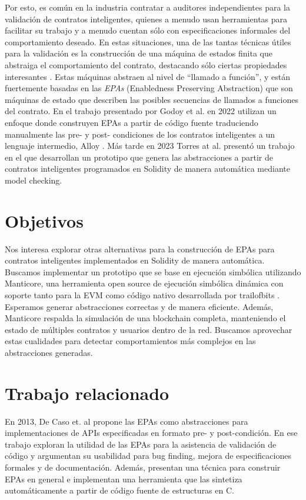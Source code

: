 Por esto, es común en la industria contratar a auditores independientes para la validación de contratos inteligentes,
quienes a menudo usan herramientas para facilitar su trabajo y a menudo cuentan sólo con especificaciones informales del comportamiento deseado.
En estas situaciones, una de las tantas técnicas útiles para la validación es  la construcción de una máquina de estados finita que abstraiga el comportamiento del contrato, destacando sólo ciertas propiedades interesantes \cite{predicate-abstraction-for-smart-contract-validation}.
Estas máquinas abstraen al nivel de ``llamado a función'', y están fuertemente basadas en las \textit{EPAs} (Enabledness Preserving Abstraction) \cite{de-caso-epa} que son máquinas de estado que describen las posibles secuencias de llamados a funciones del contrato.
En el trabajo presentado por Godoy et al. en 2022 \cite{predicate-abstraction-for-smart-contract-validation} utilizan un enfoque donde construyen EPAs a partir de código fuente traduciendo manualmente las pre- y post- condiciones de los contratos inteligentes a un lenguaje intermedio, Alloy \cite{alloy}.
Más tarde en 2023 Torres at al. \cite{torres} presentó un trabajo en el que desarrollan un prototipo que genera las abstracciones a partir de contratos inteligentes programados en Solidity de manera automática mediante model checking.

\section{Objetivos}

Nos interesa explorar otras alternativas para la construcción de EPAs para contratos inteligentes implementados en Solidity de manera automática.
Buscamos implementar un prototipo que se base en ejecución simbólica utilizando Manticore, una herramienta open source de ejecución simbólica dinámica con soporte tanto para la EVM como código nativo desarrollada por trailofbits \cite{manticore}.
Esperamos generar abstracciones correctas y de manera eficiente.
Además, Manticore respalda la simulación de una blockchain completa, manteniendo el estado de múltiples contratos y usuarios dentro de la red.
Buscamos aprovechar estas cualidades para detectar comportamientos más complejos en las abstracciones generadas.

\section{Trabajo relacionado}
En 2013, De Caso et. al \cite{de-caso-epa} propone las EPAs como abstracciones para implementaciones de APIs especificadas en formato pre- y post-condición.
En ese trabajo exploran la utilidad de las EPAs para la asistencia de validación de código y argumentan su usabilidad para bug finding, mejora de especificaciones formales y de documentación.
Además, presentan una técnica para construir EPAs en general e implementan una herramienta que las sintetiza automáticamente a partir de código fuente de estructuras en C.

